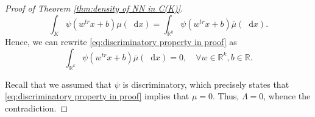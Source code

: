 \documentclass[11pt,a4paper,twoside,openany]{report}
\numberwithin{equation}{section}
\newcommand{\diff}{\mathop{}\!\mathrm{d}}
\theoremstyle{plain} %
\theoremstyle{definition} %
\theoremstyle{remark} %
\begin{document}
\begin{proof}[Proof of Theorem \ref{thm:density of NN in C(K)}]
    \begin{equation*}
         \int_K \psi(w^{tr}x+b)\mu(\diff x)=\int_{\mathbb{R}^k}\psi(w^{tr}x+b)\overline{\mu}(\diff x).
    \end{equation*}
    Hence, we can rewrite \eqref{eq:discriminatory property in proof} as 
    \begin{equation}\label{eq:discriminatory property in proof}
    \int_{\mathbb{R}^k}\psi(w^{tr}x+b)\overline{\mu}(\diff x)=0,\quad\forall w\in\mathbb{R}^k,b\in\mathbb{R}.
    \end{equation}
    
Recall that we assumed that \(\psi\) is discriminatory, which precisely states that \eqref{eq:discriminatory property in proof} implies that \(\mu=0\). Thus, \(\Lambda=0\), whence the contradiction.
\end{proof}
\end{document}
